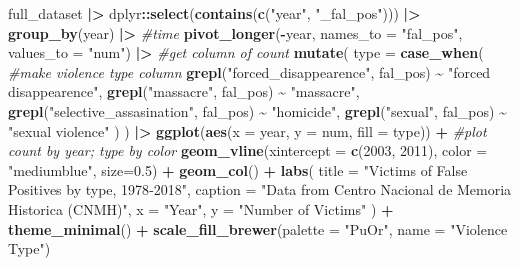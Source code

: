 \documentclass[
]{article}
\newenvironment{Shaded}{\begin{snugshade}}{\end{snugshade}}
\newcommand{\AttributeTok}[1]{\textcolor[rgb]{0.13,0.29,0.53}{#1}}
\newcommand{\CommentTok}[1]{\textcolor[rgb]{0.56,0.35,0.01}{\textit{#1}}}
\newcommand{\DecValTok}[1]{\textcolor[rgb]{0.00,0.00,0.81}{#1}}
\newcommand{\FloatTok}[1]{\textcolor[rgb]{0.00,0.00,0.81}{#1}}
\newcommand{\FunctionTok}[1]{\textcolor[rgb]{0.13,0.29,0.53}{\textbf{#1}}}
\newcommand{\NormalTok}[1]{#1}
\newcommand{\SpecialCharTok}[1]{\textcolor[rgb]{0.81,0.36,0.00}{\textbf{#1}}}
\newcommand{\StringTok}[1]{\textcolor[rgb]{0.31,0.60,0.02}{#1}}
\begin{document}
\begin{Shaded}
\begin{Highlighting}[]
\NormalTok{full\_dataset }\SpecialCharTok{|\textgreater{}}
\NormalTok{  dplyr}\SpecialCharTok{::}\FunctionTok{select}\NormalTok{(}\FunctionTok{contains}\NormalTok{(}\FunctionTok{c}\NormalTok{(}\StringTok{"year"}\NormalTok{, }\StringTok{"\_fal\_pos"}\NormalTok{))) }\SpecialCharTok{|\textgreater{}} 
  \FunctionTok{group\_by}\NormalTok{(year) }\SpecialCharTok{|\textgreater{}} \CommentTok{\#time}
  \FunctionTok{pivot\_longer}\NormalTok{(}\SpecialCharTok{{-}}\NormalTok{year, }\AttributeTok{names\_to =} \StringTok{"fal\_pos"}\NormalTok{, }\AttributeTok{values\_to =} \StringTok{"num"}\NormalTok{) }\SpecialCharTok{|\textgreater{}} \CommentTok{\#get column of count}
  \FunctionTok{mutate}\NormalTok{(}
    \AttributeTok{type =} \FunctionTok{case\_when}\NormalTok{( }\CommentTok{\#make violence type column}
      \FunctionTok{grepl}\NormalTok{(}\StringTok{"forced\_disappearence"}\NormalTok{, fal\_pos) }\SpecialCharTok{\textasciitilde{}} \StringTok{"forced disappearence"}\NormalTok{,}
      \FunctionTok{grepl}\NormalTok{(}\StringTok{"massacre"}\NormalTok{, fal\_pos) }\SpecialCharTok{\textasciitilde{}} \StringTok{"massacre"}\NormalTok{,}
      \FunctionTok{grepl}\NormalTok{(}\StringTok{"selective\_assasination"}\NormalTok{, fal\_pos) }\SpecialCharTok{\textasciitilde{}} \StringTok{"homicide"}\NormalTok{,}
      \FunctionTok{grepl}\NormalTok{(}\StringTok{"sexual"}\NormalTok{, fal\_pos) }\SpecialCharTok{\textasciitilde{}} \StringTok{"sexual violence"}
\NormalTok{    )}
\NormalTok{  ) }\SpecialCharTok{|\textgreater{}}
  \FunctionTok{ggplot}\NormalTok{(}\FunctionTok{aes}\NormalTok{(}\AttributeTok{x =}\NormalTok{ year, }\AttributeTok{y =}\NormalTok{ num, }\AttributeTok{fill =}\NormalTok{ type)) }\SpecialCharTok{+} \CommentTok{\#plot count by year; type by color}
  \FunctionTok{geom\_vline}\NormalTok{(}\AttributeTok{xintercept =} \FunctionTok{c}\NormalTok{(}\DecValTok{2003}\NormalTok{, }\DecValTok{2011}\NormalTok{), }\AttributeTok{color =} \StringTok{"mediumblue"}\NormalTok{, }\AttributeTok{size=}\FloatTok{0.5}\NormalTok{) }\SpecialCharTok{+}
    \FunctionTok{geom\_col}\NormalTok{() }\SpecialCharTok{+}
    \FunctionTok{labs}\NormalTok{(}
    \AttributeTok{title =} \StringTok{"Victims of False Positives by type, 1978{-}2018"}\NormalTok{,}
    \AttributeTok{caption =} \StringTok{"Data from Centro Nacional de Memoria Historica (CNMH)"}\NormalTok{, }
    \AttributeTok{x =} \StringTok{"Year"}\NormalTok{,}
    \AttributeTok{y =} \StringTok{"Number of Victims"}
\NormalTok{  ) }\SpecialCharTok{+}
  \FunctionTok{theme\_minimal}\NormalTok{() }\SpecialCharTok{+}
  \FunctionTok{scale\_fill\_brewer}\NormalTok{(}\AttributeTok{palette =} \StringTok{"PuOr"}\NormalTok{, }\AttributeTok{name =} \StringTok{"Violence Type"}\NormalTok{)}
\end{Highlighting}
\end{Shaded}
\end{document}
